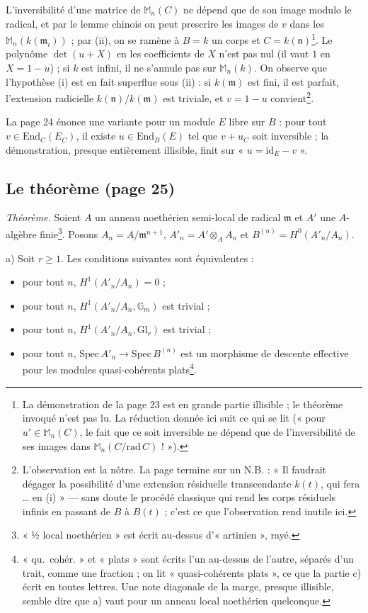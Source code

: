 \documentclass[11pt,a4paper]{article}
\begin{document}
L'inversibilité d'une matrice de $\mathbb{M}_n(C)$ ne dépend que de son image
modulo le radical, et par le lemme chinois on peut prescrire les images de $v$
dans les $\mathbb{M}_n(k(\mathfrak{m}_i))$ ; par (ii), on se ramène à $B = k$
un corps et $C = k(\mathfrak{n})$\footnote{La démonstration de la page 23 est
en grande partie illisible ; le théorème invoqué n'est pas lu. La réduction
donnée ici suit ce qui se lit (« pour $u' \in \mathbb{M}_n(C)$, le fait que
ce soit inversible ne dépend que de l'inversibilité de ses images dans
$\mathbb{M}_n(C/\mathrm{rad}\,C)$ ! »).}. Le polynôme $\det(u + X)$ en les
coefficients de $X$ n'est pas nul (il vaut $1$ en $X = 1 - u$) ; si $k$ est
infini, il ne s'annule pas sur $\mathbb{M}_n(k)$. On observe que
l'hypothèse (i) est en fait superflue sous (ii) : si $k(\mathfrak{m})$ est
fini, il est parfait, l'extension radicielle $k(\mathfrak{n})/k(\mathfrak{m})$
est triviale, et $v = 1 - u$ convient\footnote{L'observation est la nôtre.
La page termine sur un N.B. : « Il faudrait dégager la possibilité d'une
extension résiduelle transcendante $k(t)$, qui fera … en (i) » — sans doute
le procédé classique qui rend les corps résiduels infinis en passant de $B$ à
$B(t)$ ; c'est ce que l'observation rend inutile ici.}.

La page 24 énonce une variante pour un module $E$ libre sur $B$ : pour tout
$v \in \mathrm{End}_C(E_C)$, il existe $u \in \mathrm{End}_B(E)$ tel que $v +
u_C$ soit inversible ; la démonstration, presque entièrement illisible, finit
sur « $u = \mathrm{id}_E - v$ ».

\subsection*{Le théorème (page 25)}

\emph{Théorème.} Soient $A$ un anneau noethérien semi-local de radical
$\mathfrak{m}$ et $A'$ une $A$-algèbre finie\footnote{« ½ local
noethérien » est écrit au-dessus d'« artinien », rayé.}. Posons $A_n =
A/\mathfrak{m}^{n+1}$, $A'_n = A' \otimes_A A_n$ et $B^{(n)} =
H^0(A'_n/A_n)$.

a) Soit $r \geqslant 1$. Les conditions suivantes sont équivalentes :
\begin{itemize}
  \item[(i)] pour tout $n$, $H^1(A'_n/A_n) = 0$ ;
  \item[(ii$_1$)] pour tout $n$, $H^1(A'_n/A_n, \mathbb{G}_m)$ est trivial ;
  \item[(ii$_r$)] pour tout $n$, $H^1(A'_n/A_n, \mathrm{Gl}_r)$ est trivial ;
  \item[(iii)] pour tout $n$, $\mathrm{Spec}\, A'_n \to \mathrm{Spec}\,
  B^{(n)}$ est un morphisme de descente effective pour les modules
  quasi-cohérents plats\footnote{« qu.\ cohér. » et « plats » sont écrits
  l'un au-dessus de l'autre, séparés d'un trait, comme une fraction ; on lit
  « quasi-cohérents plats », ce que la partie c) écrit en toutes lettres. Une
  note diagonale de la marge, presque illisible, semble dire que a) vaut
  pour un anneau local noethérien quelconque.}.
\end{itemize}
\end{document}

